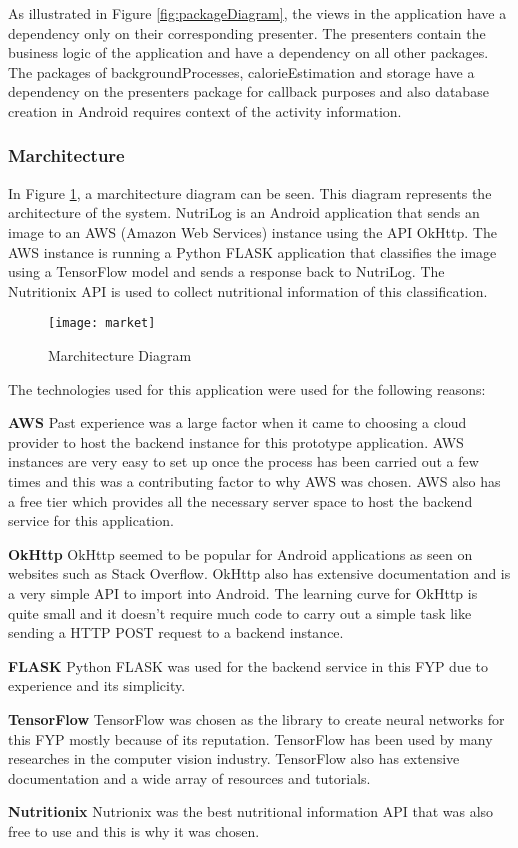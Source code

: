 As illustrated in Figure \ref{fig:packageDiagram}, the views in the application
have a dependency only on their corresponding presenter.
The presenters contain the business logic of the  application and have a dependency on all other packages.
The packages of backgroundProcesses, calorieEstimation and storage have a dependency on the presenters package for callback purposes and also database creation in Android requires context of the activity information.

\tocless\subsubsection{Marchitecture}
In Figure \ref{fig:market}, a marchitecture diagram can be seen.
This diagram represents the architecture of the system.
NutriLog is an Android application that sends an image to an AWS (Amazon Web Services) instance using the API OkHttp. The AWS instance is running a Python FLASK application that classifies the image using a TensorFlow model and sends a response back to NutriLog. The Nutritionix API is used to collect nutritional information of this classification.

\begin{figure}[h]
    \centering
    \texttt{[image: market]}
    \caption{Marchitecture Diagram}
    \label{fig:market}
\end{figure}

The technologies used for this application were used for the following reasons:

\textbf{AWS}
\linebreak
Past experience was a large factor when it came to choosing a cloud provider to host the backend instance for this prototype application.
AWS instances are very easy to set up once the process has been carried out a few times and this was a contributing factor to why AWS was chosen.
AWS also has a free tier which provides all the necessary server space to host the backend service for this application.

\textbf{OkHttp}
\linebreak
OkHttp seemed to be popular for Android applications as seen on websites such as Stack Overflow.
OkHttp also has extensive documentation and is a very simple API to import into Android.
The learning curve for OkHttp is quite small and it doesn't require much code to carry out a simple task like sending a HTTP POST request to a backend instance.

\textbf{FLASK}
\linebreak
Python FLASK was used for the backend service in this FYP due to experience and its simplicity.

\textbf{TensorFlow}
\linebreak
TensorFlow was chosen as the library to create neural networks for this FYP mostly because of its reputation.
TensorFlow has been used by many researches in the computer vision industry.
TensorFlow also has extensive documentation and a wide array of resources and tutorials.

\textbf{Nutritionix}
\linebreak
Nutrionix was the best nutritional information API that was also free to use and this is why it was chosen.